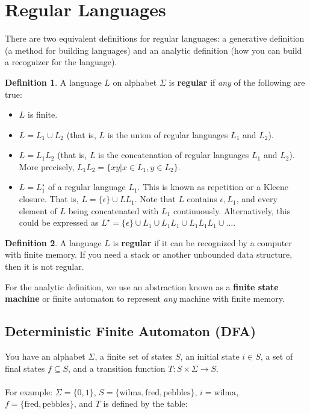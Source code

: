 \documentclass[]{article}
\theoremstyle{definition}
\newtheorem*{defn}{Definition}
\begin{document}
	\section{Regular Languages}
		There are two equivalent definitions for regular languages: a generative definition (a method for building languages) and an analytic definition (how you can build a recognizer for the language).
		\begin{defn}
			A language $L$ on alphabet $\Sigma$ is \textbf{regular} if \emph{any} of the following are true:
			\begin{itemize}
				\item $L$ is finite.
				\item $L = L_1 \cup L_2$ (that is, $L$ is the union of regular languages $L_1$ and $L_2$).
				\item $L = L_1 L_2$ (that is, $L$ is the concatenation of regular languages $L_1$ and $L_2$). More precisely, $L_1 L_2 = \{ xy | x \in L_1, y \in L_2 \}$.
				\item $L = L_1^\star$ of a regular language $L_1$. This is known as repetition or a Kleene closure. That is, $L = \{ \epsilon \} \cup L L_1$. Note that $L$ contains $\epsilon, L_1$, and every element of $L$ being concatenated with $L_1$ continuously. Alternatively, this could be expressed as $L^\star = \{ \epsilon \} \cup L_1 \cup L_1 L_1 \cup L_1 L_1 L_1 \cup \ldots$.
			\end{itemize}
		\end{defn}

		\begin{defn}
			A language $L$ is \textbf{regular} if it can be recognized by a computer with finite memory. If you need a stack or another unbounded data structure, then it is not regular.
		\end{defn}

		For the analytic definition, we use an abstraction known as a \textbf{finite state machine} or {finite automaton} to represent \emph{any} machine with finite memory.
		\subsection{Deterministic Finite Automaton (DFA)}
			You have an alphabet $\Sigma$, a finite set of states $S$, an initial state $i \in S$, a set of final states $f \subseteq S$, and a transition function $T: S \times \Sigma \to S$.
			\\ \\
			For example: $\Sigma = \{ 0, 1 \}$, $S = \{ \text{wilma}, \text{fred}, \text{pebbles} \}$, $i = \text{wilma}$, $f = \{ \text{fred}, \text{pebbles} \}$, and $T$ is defined by the table:
\end{document}
